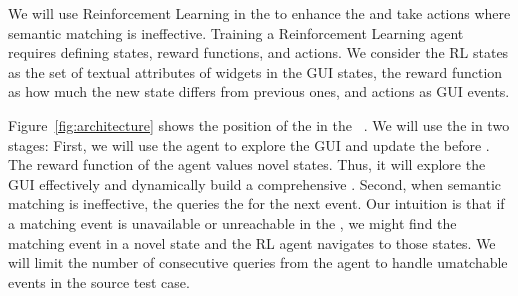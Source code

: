\smallskip
We will use Reinforcement Learning in the \testreuse to enhance the \tam and take actions where semantic matching is ineffective.
Training a Reinforcement Learning agent requires defining  states, reward functions, and actions.
We consider the RL states as the set of textual attributes of widgets in the GUI states, the reward function as how much the new state differs from previous ones, and actions as GUI events.

\smallskip 
Figure~\ref{fig:architecture} shows the position of the \rlaganet in the \testreuse~\architecture.
We will use the \rlaganet in two stages: 
First, we will use the agent to explore the GUI and update the \tam before \testreuse.
The reward function of the agent values novel states. Thus,  it will explore the GUI effectively and dynamically build a  comprehensive \tam.
Second, when semantic matching is ineffective, the \selector queries the \rlaganet for the next event.
Our intuition is that if a matching event is unavailable or unreachable in the \tam, we might find the matching event in a novel state and the RL agent navigates to those states.
We will limit the number of consecutive queries from the agent to handle umatchable events in the source test case.


